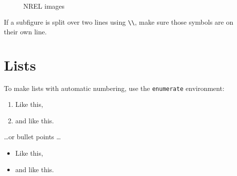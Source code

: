 \begin{figure}[htp]
\centering
\hfill
{}
~ %
\hfill
{}
\hfill
\caption{NREL images}\label{fig:NRELimages}
\end{figure}

If a subfigure is split over two lines using \verb+\\+, make sure those symbols are on their own line.

\section{Lists}

To make lists with automatic numbering, use the \texttt{enumerate} environment:

\begin{enumerate}
\item Like this,
\item and like this.
\end{enumerate}
\dots or bullet points \dots
\begin{itemize}
\item Like this,
\item and like this.
\end{itemize}

